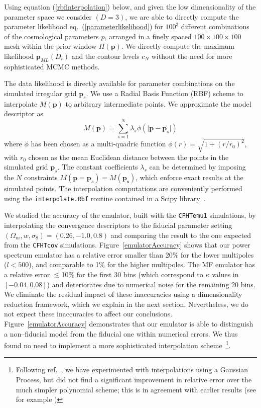\documentclass[reprint,aps,prd,superscriptaddress,showkeys,showpacs]{revtex4-1}
\begin{document}
Using equation (\ref{rbfinterpolation}) below, and given the low
dimensionality of the parameter space we consider $(D=3)$, we are able
to directly compute the parameter likelihood
eq.~(\ref{parameterlikelihood}) for $100^3$ different combinations of
the cosmological parameters $p$, arranged in a finely spaced
$100\times100\times100$ mesh within the prior window
$\Pi(\mathbf{p})$. We directly compute the maximum likelihood
$\mathbf{p}_{ML}(D_i)$ and the contour levels $c_N$ without the need
for more sophisticated MCMC methods.

The data likelihood is directly available for parameter combinations
on the simulated irregular grid $\mathbf{p}_s$.  We use a Radial Basis
Function (RBF) scheme to interpolate $M(\mathbf{p})$ to arbitrary
intermediate points.  We approximate the model descriptor as
\begin{equation}
\label{rbfinterpolation}
M(\mathbf{p}) = \sum_{s=1}^N \lambda_s\phi(\vert\mathbf{p}-\mathbf{p}_s\vert)
\end{equation}
where $\phi$ has been chosen as a multi-quadric function
$\phi(r)=\sqrt{1+(r/r_0)^2}$, with $r_0$ chosen as the mean Euclidean
distance between the points in the simulated grid $\mathbf{p}_s$. The
constant coefficients $\lambda_s$ can be determined by imposing the
$N$ constraints $M(\mathbf{p}=\mathbf{p}_s)=M(\mathbf{p_s})$, which
enforce exact results at the simulated points. The interpolation
computations are conveniently performed using the
\texttt{interpolate.Rbf} routine contained in a Scipy library~\citep{scipy}.

We studied the accuracy of the emulator, built with the
\texttt{CFHTemu1} simulations, by interpolating the convergence
descriptors to the fiducial parameter setting
$(\Omega_m,w,\sigma_8)=(0.26,-1.0,0.8)$ and comparing the result to
the one expected from the \texttt{CFHTcov}
simulations. Figure~\ref{emulatorAccuracy} shows that our power
spectrum emulator has a relative error smaller than 20\% for the lower
multipoles ($l<500$), and comparable to 1\% for the higher multipoles. The MF
emulator has a relative error $\lesssim$10\% for the first 30 bins (which
correspond to $\kappa$ values in $[-0.04,0.08]$) and deteriorates due
to numerical noise for the remaining 20 bins. We eliminate the
residual impact of these inaccuracies using a dimensionality reduction
framework, which we explain in the next section. Nevertheless, we do
not expect these inaccuracies to affect our
conclusions. Figure~\ref{emulatorAccuracy} demonstrates that our
emulator is able to distinguish a non--fiducial model from the
fiducial one within numerical errors.  We thus found no need to
implement a more sophisticated interpolation
scheme~\footnote{Following ref.~\citep{coyote2}, we have experimented with interpolations using a Gaussian Process, but did not find a significant improvement in relative error over the much simpler polynomial scheme; this is in agreement with earlier results (see for example \citep{KnoxGP})}.
\end{document}
